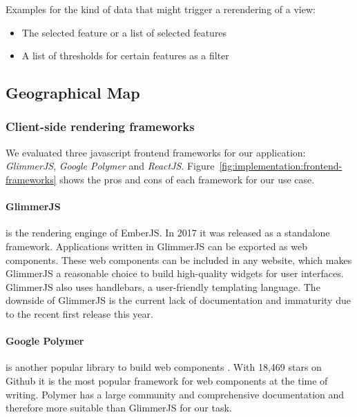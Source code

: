 \documentclass{article}
\begin{document}
Examples for the kind of data that might trigger a rerendering of a view:
\begin{itemize}
  \item
    The selected feature or a list of selected features
  \item
    A list of thresholds for certain features as a filter
\end{itemize}
\subsection{Geographical Map}



\subsubsection{Client-side rendering frameworks}

We evaluated three javascript frontend frameworks for our application: \emph{GlimmerJS}, \emph{Google Polymer} and \emph{ReactJS}.
Figure~\ref{fig:implementation:frontend-frameworks} shows the pros and cons of each framework for our use case.

\paragraph{GlimmerJS} is the rendering enginge of EmberJS\cite{Ember2017}.
In 2017 it was released as a standalone framework.
Applications written in GlimmerJS can be exported as web components.
These web components can be included in any website, which makes GlimmerJS a reasonable choice to build high-quality widgets for user interfaces.
GlimmerJS also uses handlebars\cite{Handlebars2017}, a user-friendly templating language.
The downside of GlimmerJS is the current lack of documentation and immaturity due to the recent first release this year.

\paragraph{Google Polymer} is another popular library to build web components \cite{Polymer2017}.
With 18,469 stars on Github it is the most popular framework for web components at the time of writing.
Polymer has a large community and comprehensive documentation and therefore more suitable than GlimmerJS for our task.
\end{document}

